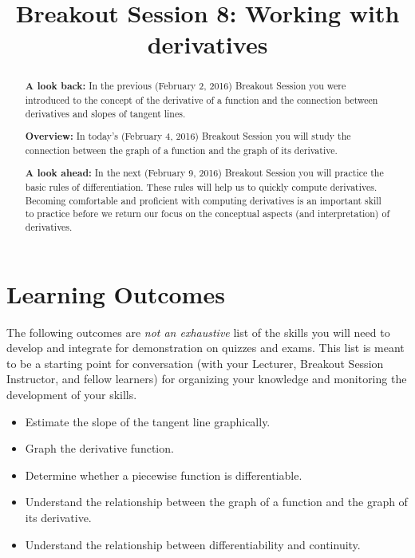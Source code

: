 \documentclass[handout,nooutcomes]{ximera}
\title{Breakout Session 8: Working with derivatives}
\begin{document}
\begin{abstract}
  \textbf{A look back:} In the previous (February 2, 2016) Breakout Session you were introduced to the concept of the derivative of a function and the connection between derivatives and slopes of tangent lines.

  \textbf{Overview:} In today's (February 4, 2016) Breakout Session you will  study the connection between the graph of a function and the graph of its derivative.

  \textbf{A look ahead:} In the next (February 9, 2016) Breakout Session you will practice the basic rules of differentiation.
  These rules will help us to quickly compute derivatives.
  Becoming comfortable and proficient with computing derivatives is an important skill to practice before we return our focus on the conceptual aspects (and interpretation) of derivatives. 
\end{abstract}
\maketitle

\section{Learning Outcomes}
\label{section:learning-outcomes}
The following outcomes are \emph{not an exhaustive} list of the skills you will need to develop and integrate for demonstration on quizzes and exams.
This list is meant to be a starting point for conversation (with your Lecturer, Breakout Session Instructor, and fellow learners) for organizing your knowledge and monitoring the development of your skills.
\begin{itemize}
  \item 
    Estimate the slope of the tangent line graphically. 

  \item 
    Graph the derivative function.

  \item 
    Determine whether a piecewise function is differentiable.

  \item 
    Understand the relationship between the graph of a function and the graph of its derivative.

  \item 
    Understand the relationship between differentiability and continuity.
\end{itemize}
\end{document}
